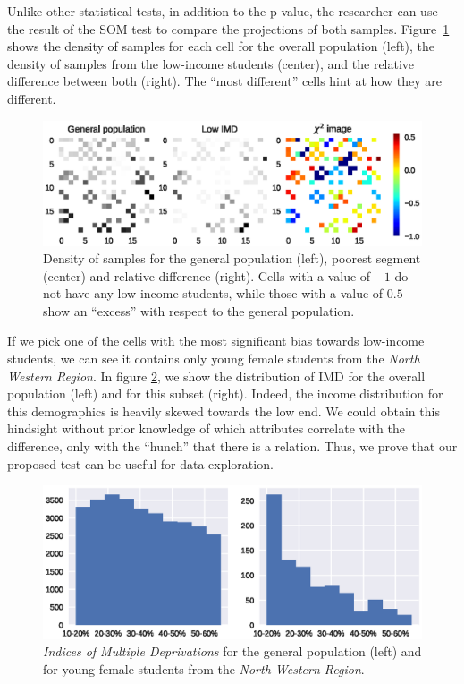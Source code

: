 Unlike other statistical tests, in addition to the p-value, the researcher can use
the result of the \gls{SOM}  test to compare the projections of both samples.
Figure~\ref{fig:oulad_grid} shows the density of samples for each cell for the overall population
(left), the density of samples from the low-income students (center), and the relative difference
between both (right). The ``most different'' cells hint at how they are different.

\begin{figure}[t]
    \centering
    \includegraphics[width=\textwidth]{images/6_som/imd.eps}
    \caption[Comparing  density variations]{Density of samples for the general population (left), poorest segment (center) and
    relative difference (right). Cells with a value of $-1$ do not have any low-income students,
    while those with a value of $0.5$ show an ``excess'' with respect to the general
    population.}
    \label{fig:oulad_grid}
\end{figure}

If we pick one of the cells with the most significant bias towards low-income students,
we can see it contains only young female students from the \emph{North Western Region}.
In figure \ref{fig:oulad_hist}, we show the distribution of \gls{IMD} for the overall population (left)
and for this subset (right). Indeed, the income distribution for this demographics is
heavily skewed towards the low end. We could obtain this hindsight without prior knowledge of which
attributes correlate with the difference, only with the ``hunch'' that
there is a relation. Thus, we prove that our proposed test can be useful for data exploration.

\begin{figure}[htbp]
    \centering
    \includegraphics[width=\textwidth]{images/6_som/imd_histogram.eps}
    \caption[Histogram of the  for two populations]{
        \emph{Indices of Multiple Deprivations} for the general population (left) and for
        young female students from the \emph{North Western Region}.
    }
    \label{fig:oulad_hist}
\end{figure}

